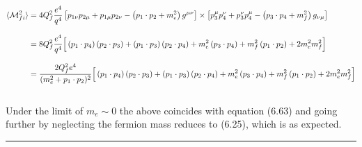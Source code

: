 \begin{solution}
\begin{align*}
    \langle \mathcal{M}_{fi}^2 \rangle  &= 4Q_f^2  \frac{  e^4}{q^4}  \left[ p_{1\nu}p_{2\mu} + p_{1\mu}p_{2\nu} -\left( p_1\cdot p_2 + m_e^2 \right) g^{\mu\nu}\right] \times \left[ p_3^\mu p_4^\nu + p_3^\nu p_4^\mu -\left( p_3\cdot p_4 + m_f^2 \right) g_{\nu\mu}\right] \\[0.12in]
    &= 8Q_f^2  \frac{e^4}{q^4} \Big[  \left(p_1\cdot p_4\right)\left(p_2\cdot p_3\right) + \left(p_1\cdot p_3\right)\left(p_2\cdot p_4\right) + m_e^2 \left( p_3\cdot p_4 \right)  + m_f^2 \left( p_1\cdot p_2 \right) + 2 m_e^2  m_f^2   \Big] \\[0.12in]
    &=  \frac{ 2Q_f^2 e^4}{(m_e^2 + p_1 \cdot p_2)^2} \Big[  \left(p_1\cdot p_4\right)\left(p_2\cdot p_3\right) + \left(p_1\cdot p_3\right)\left(p_2\cdot p_4\right) + m_e^2 \left( p_3\cdot p_4 \right)  + m_f^2 \left( p_1\cdot p_2 \right) + 2 m_e^2  m_f^2   \Big] 
\end{align*}\\
Under the limit of $m_e \sim 0 $ the above coincides with equation (6.63) and going further by neglecting the fermion mass reduces to (6.25), which is as expected.
\end{solution}

\noindent\rule{7in}{1.5pt}


